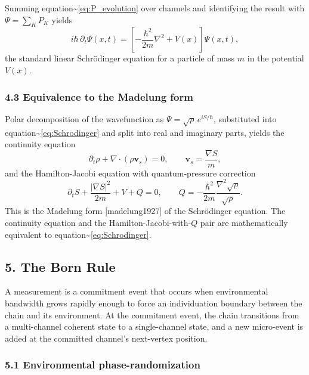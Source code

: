 \documentclass[
  11pt,
]{article}
\begin{document}
Summing equation\textasciitilde{}\eqref{eq:P_evolution} over channels
and identifying the result with \(\Psi = \sum_K P_K\) yields
\begin{equation}
  i\hbar \, \partial_t \Psi(x,t) = \left[-\frac{\hbar^2}{2m} \nabla^2 + V(x)\right] \Psi(x,t),
  \label{eq:Schrodinger}
\end{equation} the standard linear Schrödinger equation for a particle
of mass \(m\) in the potential \(V(x)\).

\subsubsection{4.3 Equivalence to the Madelung
form}\label{equivalence-to-the-madelung-form}

Polar decomposition of the wavefunction as
\(\Psi = \sqrt{\rho} \, e^{iS/\hbar}\), substituted into
equation\textasciitilde{}\eqref{eq:Schrodinger} and split into real and
imaginary parts, yields the continuity equation \begin{equation}
  \partial_t \rho + \nabla \cdot (\rho \mathbf{v}_s) = 0,
  \qquad \mathbf{v}_s = \frac{\nabla S}{m},
\end{equation} and the Hamilton-Jacobi equation with quantum-pressure
correction \begin{equation}
  \partial_t S + \frac{|\nabla S|^2}{2m} + V + Q = 0,
  \qquad Q = -\frac{\hbar^2}{2m} \frac{\nabla^2 \sqrt{\rho}}{\sqrt{\rho}}.
\end{equation} This is the Madelung form {[}madelung1927{]} of the
Schrödinger equation. The continuity equation and the
Hamilton-Jacobi-with-\(Q\) pair are mathematically equivalent to
equation\textasciitilde{}\eqref{eq:Schrodinger}.

\subsection{5. The Born Rule}\label{the-born-rule}

A measurement is a commitment event that occurs when environmental
bandwidth grows rapidly enough to force an individuation boundary
between the chain and its environment. At the commitment event, the
chain transitions from a multi-channel coherent state to a
single-channel state, and a new micro-event is added at the committed
channel's next-vertex position.

\subsubsection{5.1 Environmental
phase-randomization}\label{environmental-phase-randomization}
\end{document}
